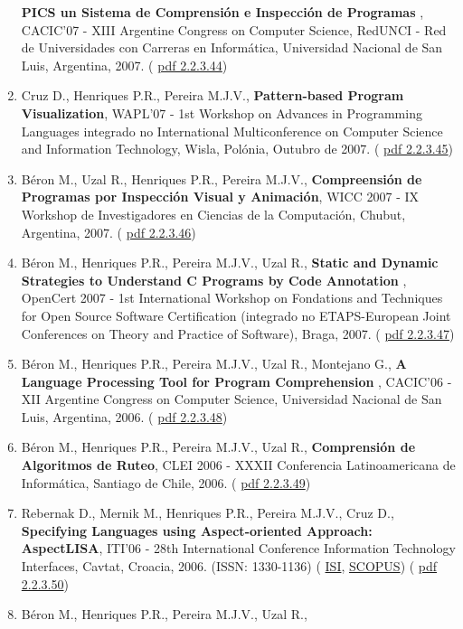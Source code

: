 \documentclass[11pt]{article}
\begin{document}
\begin{enumerate}
{{\bf{ PICS un Sistema de Comprensión e Inspección de Programas}} , CACIC'07 - XIII Argentine Congress on Computer Science, RedUNCI - Red de Universidades con Carreras en Informática, Universidad Nacional de San Luis, Argentina, 2007. (
\href{run:Publicacoes/publicacoes/22.pdf}{pdf 2.2.3.44})}
\item{Cruz D., Henriques P.R., Pereira M.J.V., {
\bf{ Pattern-based Program Visualization}}, WAPL'07 - 1st Workshop on Advances in Programming Languages integrado no International Multiconference on Computer Science and Information Technology, Wisla, Polónia, Outubro de 2007. (
\href{run:Publicacoes/publicacoes/21.pdf}{pdf 2.2.3.45})}
\item{Béron M., Uzal R., Henriques P.R., Pereira M.J.V., {
\bf{ Compreensión de Programas por Inspección Visual y Animación}}, WICC 2007 - IX Workshop de Investigadores en Ciencias de la Computación, Chubut, Argentina, 2007. (
\href{run:Publicacoes/publicacoes/27.pdf}{pdf 2.2.3.46})}
\item{Béron M., Henriques P.R., Pereira M.J.V., Uzal R., {
\bf{ Static and Dynamic Strategies to Understand C Programs by Code Annotation}} , OpenCert 2007 - 1st International Workshop on Fondations and Techniques for Open Source Software Certification (integrado no ETAPS-European Joint Conferences on Theory and Practice of Software), Braga, 2007. (
\href{run:Publicacoes/publicacoes/24.pdf}{pdf 2.2.3.47})}
\item{Béron M., Henriques P.R., Pereira M.J.V., Uzal R., Montejano G., {
\bf{ A Language Processing Tool for Program Comprehension}} , CACIC'06 - XII Argentine Congress on Computer Science, Universidad Nacional de San Luis, Argentina, 2006. (
\href{run:Publicacoes/publicacoes/15.pdf}{pdf 2.2.3.48})}
\item{Béron M., Henriques P.R., Pereira M.J.V., Uzal R., {
\bf{ Comprensión de Algoritmos de Ruteo}}, CLEI 2006 - XXXII Conferencia Latinoamericana de Informática, Santiago de Chile, 2006. (
\href{run:Publicacoes/publicacoes/18.pdf}{pdf 2.2.3.49})}
\item{Rebernak D., Mernik M., Henriques P.R., Pereira M.J.V., Cruz D., {
\bf{ Specifying Languages using Aspect-oriented Approach: AspectLISA}}, ITI'06 - 28th International Conference Information Technology Interfaces, Cavtat, Croacia, 2006. (ISSN: 1330-1136) (
\href{run:Publicacoes/ComprovativosISI.pdf}{ISI}, 
\href{run:Publicacoes/PublicacoesSCOPUS.pdf}{SCOPUS}) (
\href{run:Publicacoes/publicacoes/19.pdf}{pdf 2.2.3.50})}
\item{Béron M., Henriques P.R., Pereira M.J.V., Uzal R., {
}}
\end{enumerate}
\end{document}
